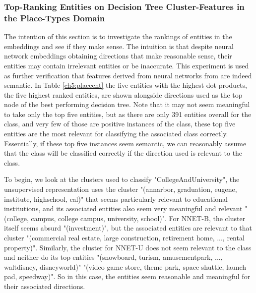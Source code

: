 \subsubsection{Top-Ranking Entities on Decision Tree Cluster-Features in the Place-Types Domain}\label{ch5:Place-Typesentities}

The intention of this section is to investigate the rankings of entities in the embeddings and see if they make sense. The intuition is that despite neural network embeddings obtaining directions that make reasonable sense, their entities may contain irrelevant entities or be inaccurate. This experiment is used as further verification that features derived from neural networks from  are indeed semantic.  In Table \ref{ch5:placeent} the five entities with the highest dot products, the five highest ranked entities, are shown alongside directions used as the top node of the best performing decision tree. Note that it may not seem meaningful to take only the top five entities, but as there are only 391 entities overall for the class, and very few of those are positive instances of the class, these  top five entities are the most relevant for classifying the associated class correctly. Essentially, if these top five instances seem semantic, we can reasonably assume that the class will be classified correctly if the direction used is relevant to the class. 

To begin, we look at the clusters used to classify "CollegeAndUniversity", the unsupervised representation uses the cluster "(annarbor, graduation, eugene, institute, highschool, cal)" that seems particularly relevant to educational institutions, and its associated entities also seem very meaningful and relevant "(college, campus, college campus, university, school)". For NNET-B, the cluster itself seems absurd "(investment)", but the associated entities are relevant to that cluster "(commercial real estate, large construction, retirement home, ..., rental property)". Similarly, the cluster for NNET-U does not seem relevant to the class and neither do its top entities "(snowboard, turism, amusementpark, ..., waltdisney, disneyworld)" "(video game store, theme park, space shuttle, launch pad, speedway)". So in this case, the entities seem reasonable and meaningful for their associated directions.

